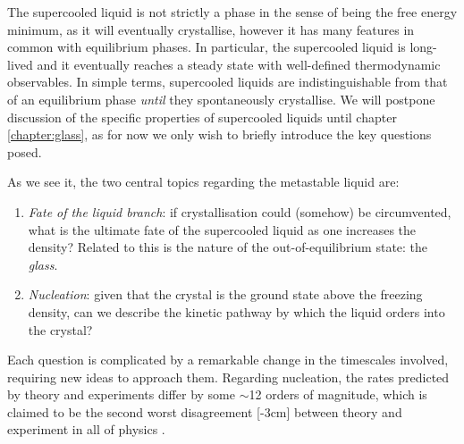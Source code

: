 \documentclass[11pt,twoside]{report}
\begin{document}
The supercooled liquid is not strictly a phase in the sense of being the free energy minimum, as it will eventually crystallise, however it has many features in common with equilibrium phases.
In particular, the supercooled liquid is long-lived and it eventually reaches a steady state with well-defined thermodynamic observables.
In simple terms, supercooled liquids are indistinguishable from that of an equilibrium phase \emph{until} they spontaneously crystallise.
We will postpone discussion of the specific properties of supercooled liquids until chapter \ref{chapter:glass}, as for now we only wish to briefly introduce the key questions posed.

As we see it, the two central topics regarding the metastable liquid are:
\begin{enumerate}
\item \emph{Fate of the liquid branch}: if crystallisation could (somehow) be circumvented, what is the ultimate fate of the supercooled liquid as one increases the density?
  Related to this is the nature of the out-of-equilibrium state: the \emph{glass}.
\item \emph{Nucleation}: given that the crystal is the ground state above the freezing density, can we describe the kinetic pathway by which the liquid orders into the crystal?
\end{enumerate}
Each question is complicated by a remarkable change in the timescales involved, requiring new ideas to approach them.
Regarding nucleation, the rates predicted by theory and experiments differ by some $\sim$12 orders of magnitude, which is claimed to be the second worst disagreement%
[-3cm]
between theory and experiment in all of physics \cite{RussoSM2013}.
\end{document}

